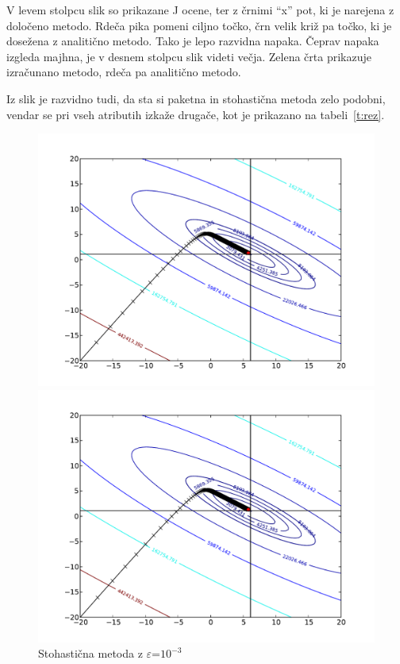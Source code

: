 \documentclass[a4paper,11pt]{article}
\begin{document}
V levem stolpcu slik so prikazane J ocene, ter z črnimi “x'' pot, ki je narejena z določeno metodo. Rdeča pika pomeni ciljno točko, črn velik križ pa točko, ki je dosežena z analitično metodo. Tako je lepo razvidna napaka. Čeprav napaka izgleda majhna, je v desnem stolpcu slik videti večja. Zelena črta prikazuje izračunano metodo, rdeča pa analitično metodo. 

Iz slik je razvidno tudi, da sta si paketna in stohastična metoda zelo podobni, vendar se pri vseh atributih izkaže drugače, kot je prikazano na tabeli~\ref{t:rez}.

\begin{figure}[h!]
\begin{minipage}[b]{0.5\linewidth}
\includegraphics[scale=0.4]{n31.pdf}
\caption{Stohastična metoda z $\varepsilon$=$10^{-3}$}
\label{fig:figure1}
\includegraphics[scale=0.4]{b31.pdf}

\end{minipage}
\end{figure}
\end{document}
